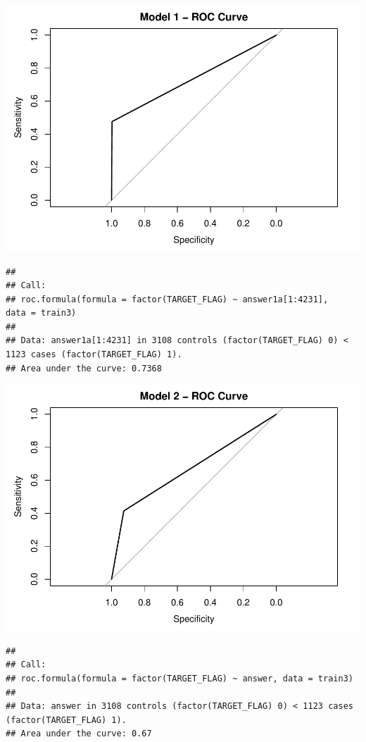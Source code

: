 \documentclass[]{article}
\begin{document}
\includegraphics{DATA621-Homework-4_files/figure-latex/unnamed-chunk-26-1.pdf}

\begin{verbatim}
## 
## Call:
## roc.formula(formula = factor(TARGET_FLAG) ~ answer1a[1:4231],     data = train3)
## 
## Data: answer1a[1:4231] in 3108 controls (factor(TARGET_FLAG) 0) < 1123 cases (factor(TARGET_FLAG) 1).
## Area under the curve: 0.7368
\end{verbatim}

\includegraphics{DATA621-Homework-4_files/figure-latex/unnamed-chunk-26-2.pdf}

\begin{verbatim}
## 
## Call:
## roc.formula(formula = factor(TARGET_FLAG) ~ answer, data = train3)
## 
## Data: answer in 3108 controls (factor(TARGET_FLAG) 0) < 1123 cases (factor(TARGET_FLAG) 1).
## Area under the curve: 0.67
\end{verbatim}
\end{document}
